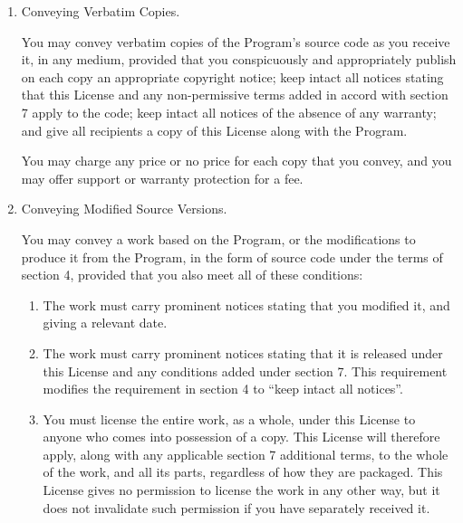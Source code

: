 \begin{enumerate}
  \item Conveying Verbatim Copies.

        You may convey verbatim copies of the Program's source code as you
        receive it, in any medium, provided that you conspicuously and
        appropriately publish on each copy an appropriate copyright notice;
        keep intact all notices stating that this License and any
        non-permissive terms added in accord with section 7 apply to the code;
        keep intact all notices of the absence of any warranty; and give all
        recipients a copy of this License along with the Program.

        You may charge any price or no price for each copy that you convey,
        and you may offer support or warranty protection for a fee.

  \item Conveying Modified Source Versions.

        You may convey a work based on the Program, or the modifications to
        produce it from the Program, in the form of source code under the
        terms of section 4, provided that you also meet all of these conditions:
        \begin{enumerate}
          \item The work must carry prominent notices stating that you modified
                it, and giving a relevant date.

          \item The work must carry prominent notices stating that it is
                released under this License and any conditions added under section
                7.  This requirement modifies the requirement in section 4 to
                ``keep intact all notices''.

          \item You must license the entire work, as a whole, under this
                License to anyone who comes into possession of a copy.  This
                License will therefore apply, along with any applicable section 7
                additional terms, to the whole of the work, and all its parts,
                regardless of how they are packaged.  This License gives no
                permission to license the work in any other way, but it does not
                invalidate such permission if you have separately received it.


\end{enumerate}
\end{enumerate}
